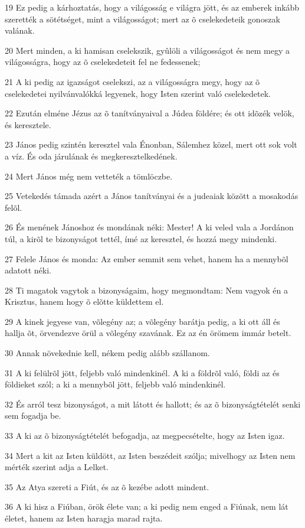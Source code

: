 \par 19 Ez pedig a kárhoztatás, hogy a világosság e világra jött, és az emberek inkább szerették a sötétséget, mint a világosságot; mert az õ cselekedeteik gonoszak valának.
\par 20 Mert minden, a ki hamisan cselekszik, gyûlöli a világosságot és nem megy a világosságra, hogy az õ cselekedeteit fel ne fedessenek;
\par 21 A ki pedig az igazságot cselekszi, az a világosságra megy, hogy az õ cselekedetei nyilvánvalókká legyenek, hogy Isten szerint való cselekedetek.
\par 22 Ezután elméne Jézus az õ tanítványaival a Júdea földére; és ott idõzék velök, és keresztele.
\par 23 János pedig szintén keresztel vala Énonban, Sálemhez közel, mert ott sok volt a víz. És oda járulának és megkeresztelkedének.
\par 24 Mert János még nem vetteték a tömlöczbe.
\par 25 Vetekedés támada azért a János tanítványai és a judeaiak között a mosakodás felõl.
\par 26 És menének Jánoshoz és mondának néki: Mester! A ki veled vala a Jordánon túl, a kirõl te bizonyságot tettél, ímé az keresztel, és hozzá megy mindenki.
\par 27 Felele János és monda: Az ember semmit sem vehet, hanem ha a mennybõl adatott néki.
\par 28 Ti magatok vagytok a bizonyságaim, hogy megmondtam: Nem vagyok én a Krisztus, hanem hogy õ  elõtte küldettem el.
\par 29 A kinek jegyese van, võlegény az; a võlegény barátja pedig, a ki ott áll és hallja õt, örvendezve örül a võlegény szavának. Ez az én örömem immár betelt.
\par 30 Annak növekednie kell, nékem pedig alább szállanom.
\par 31 A ki felülrõl jött, feljebb való mindenkinél. A ki a földrõl való, földi az és földieket szól; a ki a mennybõl  jött, feljebb való mindenkinél.
\par 32 És arról tesz bizonyságot, a mit látott és hallott; és az õ bizonyságtételét senki sem fogadja be.
\par 33 A ki az õ bizonyságtételét befogadja, az megpecsételte, hogy az  Isten igaz.
\par 34 Mert a kit az Isten küldött, az Isten beszédeit szólja; mivelhogy az Isten nem mérték szerint adja a Lelket.
\par 35 Az Atya szereti a Fiút, és az õ kezébe adott mindent.
\par 36 A ki hisz a Fiúban, örök élete van; a ki pedig nem enged a Fiúnak, nem lát életet, hanem az Isten haragja marad rajta.

